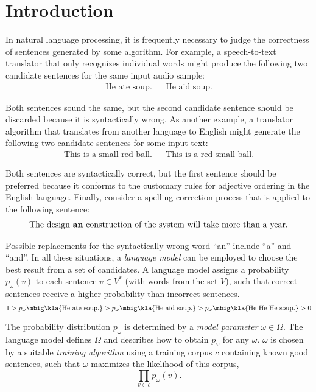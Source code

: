 \chapter{Introduction}

In natural language processing, it is frequently necessary to judge the
correctness of sentences generated by some algorithm. For example, a
speech-to-text translator that only recognizes individual words might produce
the following two candidate sentences for the same input audio sample:
\begin{align*}
 \text{He ate soup.} &&
 \text{He aid soup.}
\end{align*}

Both sentences sound the same, but the second candidate sentence should be
discarded because it is syntactically wrong. As another example, a translator
algorithm that translates from another language to English might generate the
following two candidate sentences for some input text:
\begin{align*}
 \text{This is a small red ball.} &&
 \text{This is a red small ball.}
\end{align*}

Both sentences are syntactically correct, but the first sentence should be
preferred because it conforms to the customary rules for adjective ordering in
the English language. Finally, consider a spelling correction process that is
applied to the following sentence: \cite{kukich1992}
\begin{align*}
 \text{The design \textbf{an} construction of the system will take more than a year.}
\end{align*}

Possible replacements for the syntactically wrong word ``an'' include ``a'' and
``and''. In all these situations, a \emph{language model} can be employed to
choose the best result from a set of candidates.
\cite{stolcke2002,youngetal2005} A language model assigns a probability $p_\omega(v)$
to each sentence $v\in V^*$ (with words from the set $V$), such that
correct sentences receive a higher probability than incorrect sentences.
\[
 1 > p_\omega\mbig\kla{\text{He ate soup.}} > p_\omega\mbig\kla{\text{He aid soup.}} > p_\omega\mbig\kla{\text{He He He soup.}} > 0
\]

The probability distribution $p_\omega$ is determined by a \emph{model
parameter} $\omega\in\Omega$. The language model defines $\Omega$ and describes
how to obtain $p_\omega$ for any $\omega$. $\omega$ is chosen by a suitable
\emph{training algorithm} using a training corpus $c$ containing known good
sentences, such that $\omega$ maximizes the likelihood of this corpus,
\[
 \prod_{v\in c} p_\omega(v).
\]

